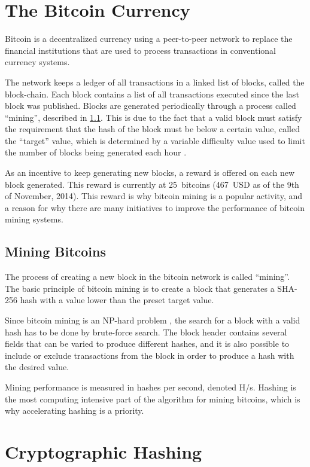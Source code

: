 \section{The Bitcoin Currency}
\label{sec:bitcoins}
Bitcoin is a decentralized currency using a peer-to-peer network to replace
the financial institutions that are used to process transactions in conventional
currency systems.

The network keeps a ledger of all transactions in a linked list of blocks, called the
block-chain. Each block contains a list of all transactions executed since the last
block was published. Blocks are generated periodically through a process
called ``mining'', described in \ref{sec:bitcoin-mining}. This is due to the fact that
a valid block must satisfy the requirement that the hash of the block must be below a certain value,
called the ``target'' value, which is determined by a variable difficulty value used to limit the number
of blocks being generated each hour \cite{bitcoin}.

As an incentive to keep generating new blocks, a reward is offered on each new block
generated. This reward is currently at 25~bitcoins (467~USD as of the 9th of November, 2014).
This reward is why bitcoin mining is a popular activity, and a reason for why
there are many initiatives to improve the performance of bitcoin mining systems.

\subsection{Mining Bitcoins}
\label{sec:bitcoin-mining}
The process of creating a new block in the bitcoin network is called ``mining''. The basic
principle of bitcoin mining is to create a block that generates a SHA-256 hash with
a value lower than the preset target value.

Since bitcoin mining is an NP-hard problem \cite{bitcoin-np}, the search for a block with a valid
hash has to be done by brute-force search. The block header contains several fields
that can be varied to produce different hashes, and it is also possible to include
or exclude transactions from the block in order to produce a hash with the desired
value.

Mining performance is measured in hashes per second, denoted H/s. Hashing is the
most computing intensive part of the algorithm for mining bitcoins, which is
why accelerating hashing is a priority.

\section{Cryptographic Hashing}

